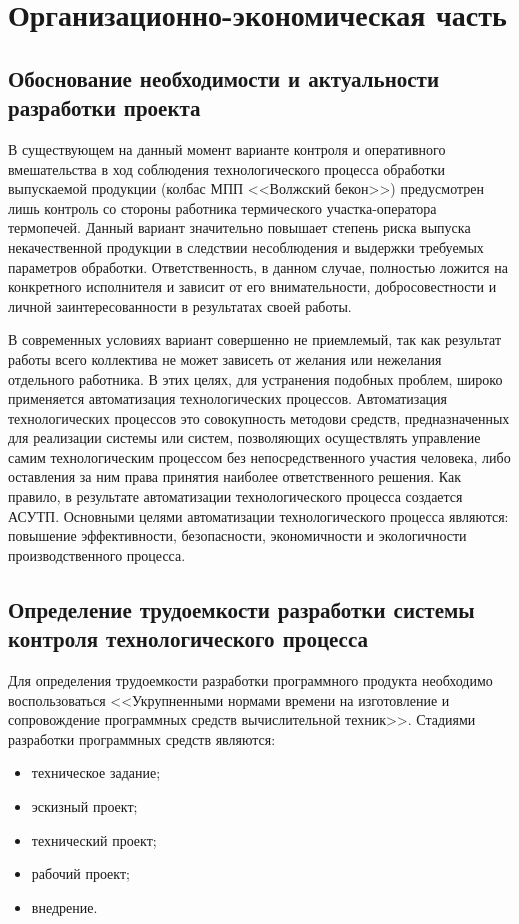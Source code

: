 \section{Организационно-экономическая часть}

\subsection{Обоснование необходимости и актуальности разработки проекта}
\begin{par}
В существующем на данный момент варианте контроля и оперативного
вмешательства в ход соблюдения технологического процесса обработки выпускаемой продукции (колбас
МПП <<Волжский бекон>>) предусмотрен лишь контроль со стороны работника термического
участка-оператора термопечей. Данный вариант значительно повышает степень риска выпуска некачественной
продукции в следствии несоблюдения и выдержки требуемых параметров обработки. Ответственность, в
данном случае, полностью ложится на конкретного исполнителя и зависит от его внимательности,
добросовестности и личной заинтересованности в результатах своей работы.
\end{par}

\begin{par}
В современных условиях вариант совершенно не приемлемый, так как результат  работы всего
коллектива не может зависеть от желания или нежелания отдельного работника.
В этих целях, для устранения подобных проблем, широко применяется 
автоматизация технологических процессов. Автоматизация технологических процессов это
совокупность методови средств, предназначенных для реализации системы или систем, позволяющих
осуществлять управление самим технологическим процессом без непосредственного участия человека,
либо оставления за ним права принятия наиболее ответственного решения.
Как правило, в результате автоматизации технологического процесса создается АСУТП.
Основными целями автоматизации технологического процесса являются: повышение эффективности,
безопасности, экономичности и экологичности производственного процесса.
\end{par}

\subsection{Определение трудоемкости разработки системы контроля технологического процесса}
Для определения трудоемкости разработки программного продукта необходимо воспользоваться <<Укрупненными
нормами времени на изготовление и сопровождение программных средств вычислительной техник>>.
Стадиями разработки программных средств являются:
\begin{itemize}
    \item{} техническое задание;
    \item{} эскизный проект;
    \item{} технический проект;
    \item{} рабочий проект;
    \item{} внедрение.
\end{itemize}

